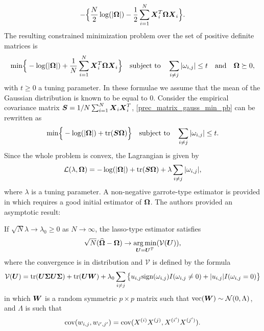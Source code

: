 \begin{equation}
  -\Big\{\frac{N}{2}\log(|\boldsymbol\Omega|) - \frac{1}{2}\sum_{i=1}^N\boldsymbol X_i^T\boldsymbol\Omega\boldsymbol X_i\Big\}.
\end{equation}
The resulting constrained minimization problem over the set of positive definite matrices is
\begin{equation}
\label{prec_matrix_gauss_min_pb}
  \text{min}\Big\{-\log(|\boldsymbol\Omega|) + \frac{1}{N}\sum_{i=1}^N\boldsymbol X_i^T\boldsymbol\Omega\boldsymbol X_i\Big\} \quad \text{subject to}\quad \sum_{i\neq j} |\omega_{i,j}|\leq t \quad \text{and}\quad \boldsymbol\Omega \succeq 0,
\end{equation}
with $t\geq 0$ a tuning parameter. In these formulae we assume that the mean of the Gaussian distribution is known to be equal to 0. Consider the empirical covariance matrix $\boldsymbol S=1/N\sum_{i=1}^N\boldsymbol X_i\boldsymbol X_i^T$, \cref{prec_matrix_gauss_min_pb} can be rewritten as 
\begin{equation}
  \text{min}\Big\{-\log(|\boldsymbol\Omega|) + \text{tr}(\boldsymbol S\boldsymbol\Omega)\Big\} \quad \text{subject to}\quad \sum_{i\neq j} |\omega_{i,j}|\leq t.
\end{equation}
Since the whole problem is convex, the Lagrangian is given by
\begin{equation}
\label{yuan_lkhood_pb}
  \mathcal L (\lambda, \boldsymbol\Omega) = -\log(|\boldsymbol\Omega|) + \text{tr}(\boldsymbol S\boldsymbol\Omega) + \lambda\sum_{i\neq j} |\omega_{i,j}|,
\end{equation}
where $\lambda$ is a tuning parameter. A non-negative garrote-type estimator is provided in \citep{yuanLin_graph} which requires a good initial estimator of $\boldsymbol\Omega$. The authors provided an asymptotic result:
\begin{theorem}
If $\sqrt{N}\lambda \rightarrow \lambda_0\geq0$  as $N\rightarrow\infty$, the lasso-type estimator satisfies
\begin{equation*}
  \sqrt{N}(\widehat{\boldsymbol\Omega}-\boldsymbol\Omega)\rightarrow\operatorname*{arg\,min}_{\boldsymbol U=\boldsymbol U^T}(\mathcal{V}(\boldsymbol U)),
\end{equation*}
where the convergence is in distribution and $\mathcal{V}$ is defined by the formula
\begin{equation*}
  \mathcal{V}(\boldsymbol U)=\textnormal{tr}(\boldsymbol U \boldsymbol\Sigma \boldsymbol U \boldsymbol\Sigma)+\textnormal{tr}(\boldsymbol U \boldsymbol W)+\lambda_0\sum_{i\neq j}\big\{ u_{i,j}\textnormal{sign}(\omega_{i,j})I(\omega_{i,j}\neq 0)+|u_{i,j}|I(\omega_{i,j} =0) \big\}
\end{equation*}
in which $\boldsymbol W$ is a random symmetric $p\times p$ matrix such that $\textnormal{vec}(\boldsymbol W) \sim \mathcal N (0, \Lambda)$, and  $\Lambda$ is such that
\begin{equation*}
  \textnormal{cov}(w_{i,j},w_{i',j'}) = \textnormal{cov}(X^{(i)}X^{(j)},X^{(i')}X^{(j')}).
\end{equation*}
\end{theorem}
